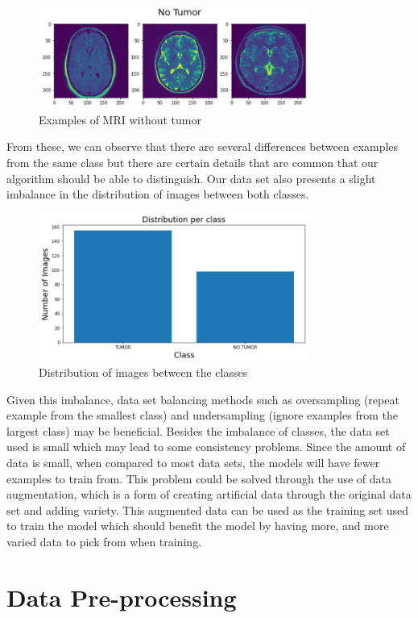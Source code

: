\documentclass[conference]{IEEEtran}
\begin{document}
\begin{figure}[H]
    \centering
    \includegraphics[width=3.5in]{hasnt_tumor.PNG}
    \caption{Examples of MRI without tumor}\label{fig:fig2}
\end{figure}

From these, we can observe that there are several differences between examples from the same class but there are certain details that are common that our algorithm should be able to distinguish. Our data set also presents a slight imbalance in the distribution of images between both classes.

\begin{figure}[H]
    \centering
    \includegraphics[width=3.5in]{class_distribution.PNG}
    \caption{Distribution of images between the classes}\label{fig:fig3}
\end{figure}

Given this imbalance, data set balancing methods such as oversampling (repeat example from the smallest class) and undersampling (ignore examples from the largest class) may be beneficial.
Besides the imbalance of classes, the data set used is small which may lead to some consistency problems. Since the amount of data is small, when compared to most data sets, the models will have fewer examples to train from. This problem could be solved through the use of data augmentation, which is a form of creating artificial data through the original data set and adding variety. This augmented data can be used as the training set used to train the model which should benefit the model by having more, and more varied data to pick from when training.

\section{Data Pre-processing}
\end{document}
